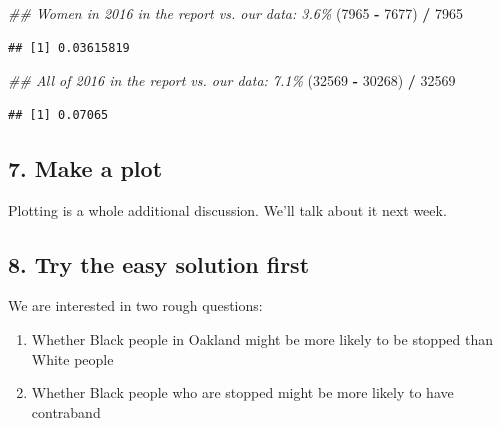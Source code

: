 \documentclass[
]{article}
\newenvironment{Shaded}{\begin{snugshade}}{\end{snugshade}}
\newcommand{\CommentTok}[1]{\textcolor[rgb]{0.56,0.35,0.01}{\textit{#1}}}
\newcommand{\DecValTok}[1]{\textcolor[rgb]{0.00,0.00,0.81}{#1}}
\newcommand{\NormalTok}[1]{#1}
\newcommand{\OperatorTok}[1]{\textcolor[rgb]{0.81,0.36,0.00}{\textbf{#1}}}
\newcommand{\StringTok}[1]{\textcolor[rgb]{0.31,0.60,0.02}{#1}}
\providecommand{\tightlist}{%
  \setlength{\itemsep}{0pt}\setlength{\parskip}{0pt}}
\begin{document}
\begin{Shaded}
\begin{Highlighting}[]
\CommentTok{\#\# Women in 2016 in the report vs. our data: 3.6\%}
\NormalTok{(}\DecValTok{7965} \OperatorTok{{-}}\StringTok{ }\DecValTok{7677}\NormalTok{) }\OperatorTok{/}\StringTok{ }\DecValTok{7965}
\end{Highlighting}
\end{Shaded}

\begin{verbatim}
## [1] 0.03615819
\end{verbatim}

\begin{Shaded}
\begin{Highlighting}[]
\CommentTok{\#\# All of 2016 in the report vs. our data: 7.1\%}
\NormalTok{(}\DecValTok{32569} \OperatorTok{{-}}\StringTok{ }\DecValTok{30268}\NormalTok{) }\OperatorTok{/}\StringTok{ }\DecValTok{32569}
\end{Highlighting}
\end{Shaded}

\begin{verbatim}
## [1] 0.07065
\end{verbatim}

\hypertarget{make-a-plot}{%
\subsection{7. Make a plot}\label{make-a-plot}}

Plotting is a whole additional discussion. We'll talk about it next week.

\hypertarget{try-the-easy-solution-first}{%
\subsection{8. Try the easy solution first}\label{try-the-easy-solution-first}}

We are interested in two rough questions:

\begin{enumerate}
\def\labelenumi{\arabic{enumi}.}
\tightlist
\item
  Whether Black people in Oakland might be more likely to be stopped than White people
\item
  Whether Black people who are stopped might be more likely to have contraband
\end{enumerate}
\end{document}
